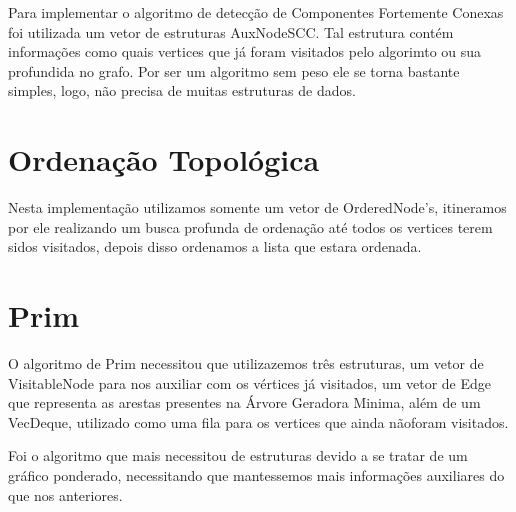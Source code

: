 \documentclass{article}
\begin{document}
Para implementar o algoritmo de detecção de Componentes Fortemente Conexas foi utilizada um vetor de estruturas AuxNodeSCC. Tal estrutura contém informações como quais vertices que já foram visitados pelo algorimto ou  sua profundida no grafo. 
Por ser um algoritmo sem peso ele se torna bastante simples, logo, não precisa de muitas estruturas de dados.

\section{Ordenação Topológica}
Nesta implementação utilizamos somente um vetor de OrderedNode's, itineramos por ele realizando um busca profunda de ordenação até todos os vertices terem sidos visitados, depois disso ordenamos a lista que estara ordenada.

\section{Prim}
O algoritmo de Prim necessitou que utilizazemos três estruturas, um vetor de VisitableNode para nos auxiliar com os vértices já visitados, um vetor de Edge que representa as arestas presentes na Árvore Geradora Minima, além de um VecDeque, utilizado como uma fila para os vertices que ainda nãoforam visitados.

Foi o algoritmo que mais necessitou de estruturas devido a se tratar de um gráfico ponderado, necessitando que mantessemos mais informações auxiliares do que nos anteriores.
\end{document}
